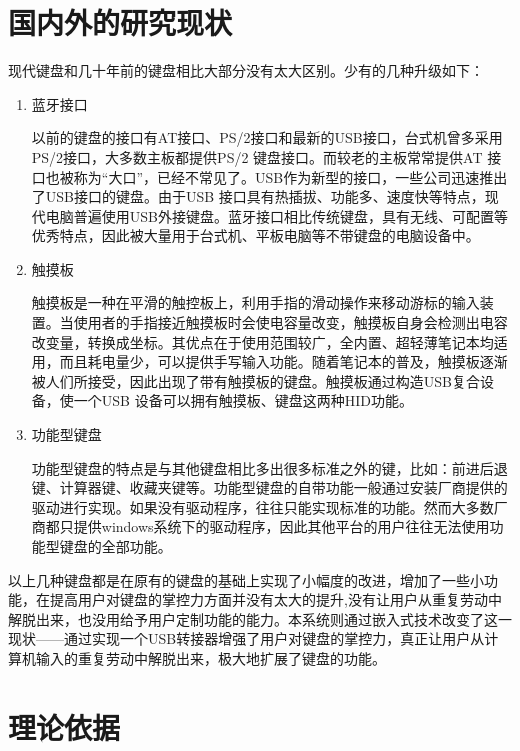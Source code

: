 \section{国内外的研究现状}
现代键盘和几十年前的键盘相比大部分没有太大区别。少有的几种升级如下：
\begin{enumerate}
\item 蓝牙接口

以前的键盘的接口有AT接口、PS/2接口和最新的USB接口，台式机曾多采用PS/2接口，大多数主板都提供PS/2 键盘接口。而较老的主板常常提供AT 接口也被称为“大口”，已经不常见了。USB作为新型的接口，一些公司迅速推出了USB接口的键盘。由于USB 接口具有热插拔、功能多、速度快等特点，现代电脑普遍使用USB外接键盘。蓝牙接口相比传统键盘，具有无线、可配置等优秀特点，因此被大量用于台式机、平板电脑等不带键盘的电脑设备中。



\item 触摸板

触摸板是一种在平滑的触控板上，利用手指的滑动操作来移动游标的输入装置。当使用者的手指接近触摸板时会使电容量改变，触摸板自身会检测出电容改变量，转换成坐标。其优点在于使用范围较广，全内置、超轻薄笔记本均适用，而且耗电量少，可以提供手写输入功能。随着笔记本的普及，触摸板逐渐被人们所接受，因此出现了带有触摸板的键盘。触摸板通过构造USB复合设备，使一个USB 设备可以拥有触摸板、键盘这两种HID功能。

\item 功能型键盘

功能型键盘的特点是与其他键盘相比多出很多标准之外的键，比如：前进后退键、计算器键、收藏夹键等。功能型键盘的自带功能一般通过安装厂商提供的驱动进行实现。如果没有驱动程序，往往只能实现标准的功能。然而大多数厂商都只提供windows系统下的驱动程序，因此其他平台的用户往往无法使用功能型键盘的全部功能。


\end{enumerate}

以上几种键盘都是在原有的键盘的基础上实现了小幅度的改进，增加了一些小功能，在提高用户对键盘的掌控力方面并没有太大的提升,没有让用户从重复劳动中解脱出来，也没用给予用户定制功能的能力。本系统则通过嵌入式技术改变了这一现状——通过实现一个USB转接器增强了用户对键盘的掌控力，真正让用户从计算机输入的重复劳动中解脱出来，极大地扩展了键盘的功能。

\section{理论依据}





















